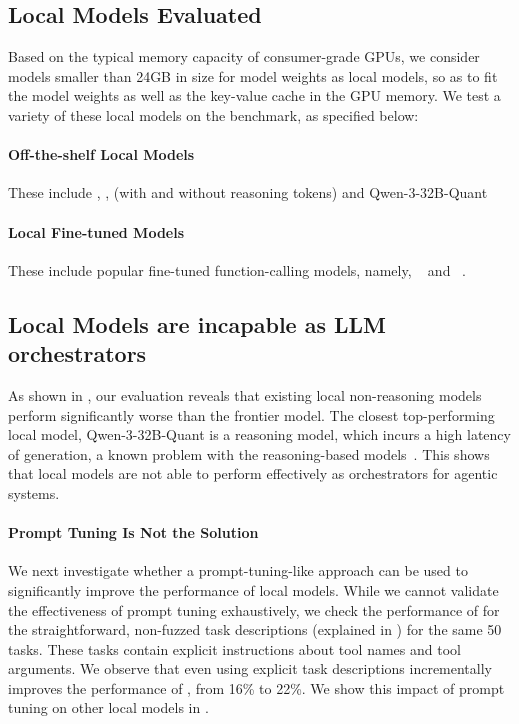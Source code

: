 \subsection{Local Models Evaluated}
Based on the typical memory capacity of consumer-grade GPUs, we consider models smaller than 24GB in size for model weights as local models, so as to fit the model weights as well as the key-value cache in the GPU memory. We test a variety of these local models on the benchmark, as specified below:

\paragraph{Off-the-shelf Local Models}
 These include \basemodel{} \cite{yang2024qwen25}, \llamathreeeightb{} \cite{grattafiori2024llama}, \qwenthreeeightb{} \cite{yang2025qwen3} (with and without reasoning tokens) and Qwen-3-32B-Quant~\cite{yang2025qwen3}

\paragraph{Local Fine-tuned Models}
These include popular fine-tuned function-calling models, namely, \xlam{}~\cite{zhang2024xlam} and \toolace{}~\cite{liu2024toolace}. 

\subsection{Local Models are incapable as LLM orchestrators}
As shown in , our evaluation reveals that existing local non-reasoning models perform significantly worse than the frontier \gptfivemini{} model. The closest top-performing local model, Qwen-3-32B-Quant is a reasoning model, which incurs a high latency of generation, a known problem with the reasoning-based models~\cite{liu2025efficientinferencelargereasoning}. This shows that local models are not able to perform effectively as orchestrators for agentic systems. 

\paragraph{Prompt Tuning Is Not the Solution}
We next investigate whether a prompt-tuning-like approach can be used to significantly improve the performance of local models. While we cannot validate the effectiveness of prompt tuning exhaustively, we check the performance of \baselinemodel{} for the straightforward, non-fuzzed task descriptions (explained in ) for the same 50 tasks. These tasks contain explicit instructions about tool names and tool arguments. We observe that even using explicit task descriptions incrementally improves the performance of \baselinemodel{}, from 16\% to 22\%. We show this impact of prompt tuning on other local models in .


